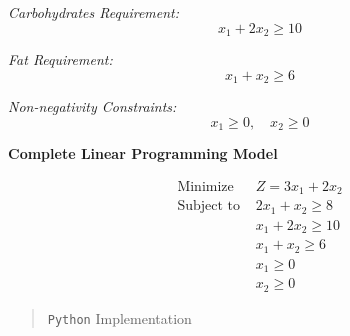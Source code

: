 \documentclass[
  letterpaper,
  DIV=11,
  numbers=noendperiod]{scrreprt}
\begin{document}
\emph{Carbohydrates Requirement:} \[
x_1 + 2x_2 \geq 10
\]

\emph{Fat Requirement:} \[
x_1 + x_2 \geq 6
\]

\emph{Non-negativity Constraints:} \[
x_1 \geq 0, \quad x_2 \geq 0
\]

\textbf{Complete Linear Programming Model}

\[
\begin{aligned}
\text{Minimize } & Z = 3x_1 + 2x_2 \\
\text{Subject to } & 2x_1 + x_2 \geq 8 \\
& x_1 + 2x_2 \geq 10 \\
& x_1 + x_2 \geq 6 \\
& x_1 \geq 0 \\
& x_2 \geq 0
\end{aligned}
\]

\begin{quote}
\texttt{Python} Implementation
\end{quote}
\end{document}
